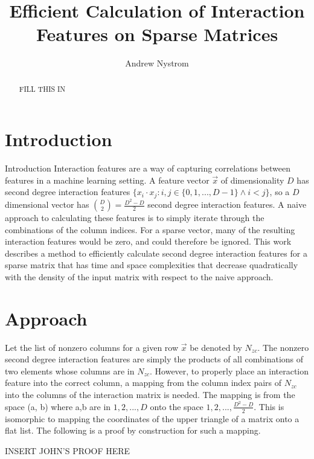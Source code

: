 \documentclass[11pt]{article}
\begin{document}
\title{Efficient Calculation of Interaction Features on Sparse Matrices}
\author{Andrew Nystrom}
\date{}

\maketitle

\begin{abstract}%
FILL THIS IN
\end{abstract}

\section{Introduction}

Introduction
Interaction features are a way of capturing correlations between features in a machine 
learning setting. A feature vector $\vec{x}$ of dimensionality $D$ has second degree interaction features 
$\{x_i \cdot x_j : i, j \in \{0,1,..., D-1\} \land i < j\}$, 
so a $D$ dimensional vector has $\binom{D}{2} = \frac{D^2-D}{2}$ second degree interaction features. A naive
approach to calculating these features is to simply iterate through the combinations of the column indices.
For a sparse vector, many of the resulting interaction features would be zero, and could therefore be ignored.
This work describes a method to efficiently calculate second degree interaction features for a sparse matrix 
that has time and space complexities that decrease quadratically with the density of the input matrix with respect to the naive approach.

\section{Approach}
Let the list of nonzero columns for a given row $\vec{x}$ be denoted by $N_{zc}$. The nonzero second degree 
interaction features are simply the products of all combinations of two elements whose 
columns are in $N_{zc}$. However, to properly place an interaction feature into the correct column, a mapping from the column 
index pairs of $N_{zc}$ into the columns of the interaction matrix is needed. The mapping is 
from the space (a, b) where a,b are in $1,2,..., D$ onto the space $1,2,..., \frac{D^2-D}{2}$. This 
is isomorphic to mapping the coordinates of the upper triangle of a matrix onto a flat 
list. The following is a proof by construction for such a mapping.

INSERT JOHN'S PROOF HERE
\end{document}
